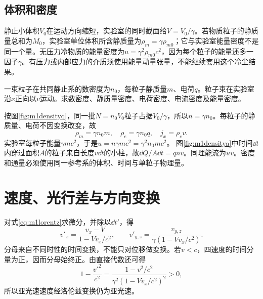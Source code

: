 \subsection{体积和密度}
静止小体积$V_0$在运动方向缩短，实验室的同时截面给$V=V_0/\gamma$。若物质粒子的静质量总和为$M_0$，实验室单位体积所含静质量为$\rho_m=\gamma\rho_{m0}$；它与实验室能量密度不是同一个量。无压力冷物质的能量密度为$u=\gamma^2\rho_{m0}c^2$，因为每个粒子的能量还多一因子$\gamma$。有压力或内部应力的介质须使用能量动量张量，不能继续套用这个冷尘结果。

\begin{example}\label{ex:m1density}
一束粒子在共同静止系的数密度为$n_0$，每粒子静质量$m$、电荷$q$。粒子束在实验室沿$x$正向以$v$运动。求数密度、静质量密度、电荷密度、电流密度及能量密度。
\end{example}
\begin{solution}
按图\ref{fig:m1densityq}，同一批$N=n_0V_0$粒子占据$V_0/\gamma$，所以$n=\gamma n_0$。每粒子的静质量、电荷不因变换改变，故
\[
 \rho_m=\gamma n_0m,\quad \rho_e=\gamma n_0q,\quad j_x=\rho_ev.
\]
实验室每粒子能量$\gamma mc^2$，于是$u=n\gamma mc^2=\gamma^2n_0mc^2$。
图\ref{fig:m1densitya}中时间$\dd t$内穿过面积$A$的粒子来自长度$v\dd t$的小柱，故$\dd Q/A\dd t=qnv$。同理能流为$uv$。密度和通量必须使用同一参考系的体积、时间与单粒子物理量。
\end{solution}

\section{速度、光行差与方向变换}\label{th:m1velocity}
对式\eqref{eq:m1lorentz}求微分，并除以$\dd t'$，得
\begin{equation}\label{eq:m1vel}
 v'_x=\frac{v_x-V}{1-Vv_x/c^2},\qquad
 v'_{y,z}=\frac{v_{y,z}}{\gamma(1-Vv_x/c^2)}.
\end{equation}
分母来自不同时性的时间变换，不能只对位移做变换。若$v<c$，四速度的时间分量为正，因而分母始终正。由直接代数还可得
\[
 1-\frac{v'^2}{c^2}=\frac{1-v^2/c^2}{\gamma^2(1-Vv_x/c^2)^2}>0,
\]
所以亚光速速度经洛伦兹变换仍为亚光速。

